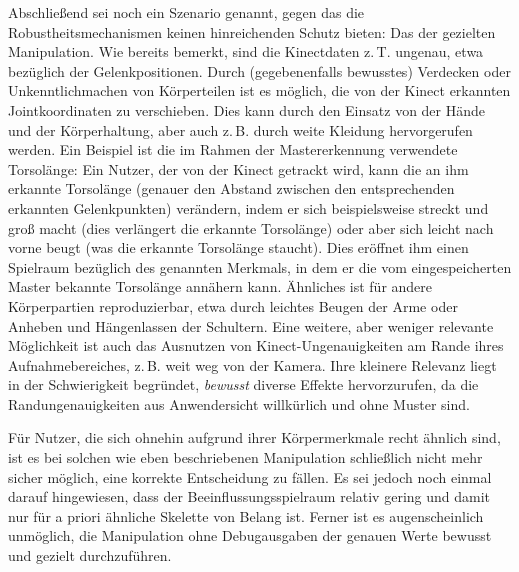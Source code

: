 	Abschließend sei noch ein Szenario genannt, gegen das die Robustheitsmechanismen keinen hinreichenden Schutz bieten: Das der gezielten Manipulation. Wie bereits bemerkt, sind die Kinectdaten z.\,T. ungenau, etwa bezüglich der Gelenkpositionen. Durch (gegebenenfalls bewusstes) Verdecken oder Unkenntlichmachen von Körperteilen ist es möglich, die von der Kinect erkannten Jointkoordinaten zu verschieben. Dies kann durch den Einsatz von der Hände und der Körperhaltung, aber auch z.\,B. durch weite Kleidung hervorgerufen werden. Ein Beispiel ist die im Rahmen der Mastererkennung verwendete Torsolänge: Ein Nutzer, der von der Kinect getrackt wird, kann die an ihm erkannte Torsolänge (genauer den Abstand zwischen den entsprechenden erkannten Gelenkpunkten) verändern, indem er sich beispielsweise streckt und \glqq groß macht\grqq{} (dies verlängert die erkannte Torsolänge) oder aber sich leicht nach vorne beugt (was die erkannte Torsolänge staucht). Dies eröffnet ihm einen Spielraum bezüglich des genannten Merkmals, in dem er die vom eingespeicherten Master bekannte Torsolänge annähern kann. Ähnliches ist für andere Körperpartien reproduzierbar, etwa durch leichtes Beugen der Arme oder Anheben und Hängenlassen der Schultern. Eine weitere, aber weniger relevante Möglichkeit ist auch das Ausnutzen von Kinect-Ungenauigkeiten am Rande ihres Aufnahmebereiches, z.\,B. weit weg von der Kamera. Ihre kleinere Relevanz liegt in der Schwierigkeit begründet, \emph{bewusst} diverse Effekte hervorzurufen, da die Randungenauigkeiten aus Anwendersicht willkürlich und ohne Muster sind.\par\bigskip
	Für Nutzer, die sich ohnehin aufgrund ihrer Körpermerkmale recht ähnlich sind, ist es bei solchen wie eben beschriebenen Manipulation schließlich nicht mehr sicher möglich, eine korrekte Entscheidung zu fällen. Es sei jedoch noch einmal darauf hingewiesen, dass der Beeinflussungsspielraum relativ gering und damit nur für a priori ähnliche Skelette von Belang ist. Ferner ist es augenscheinlich unmöglich, die Manipulation ohne Debugausgaben der genauen Werte bewusst und gezielt durchzuführen.
